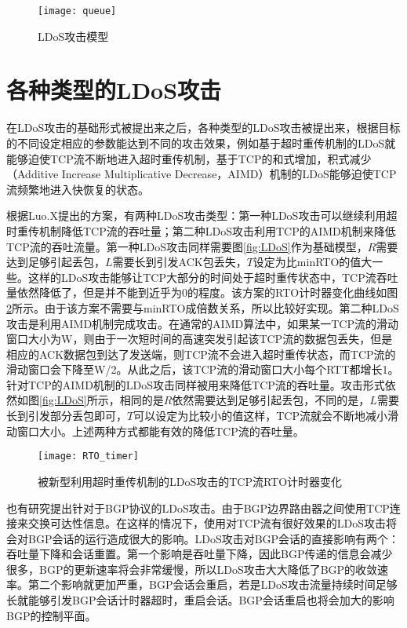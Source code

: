 \begin{figure}
    \centering
    \texttt{[image: queue]}
    \caption{LDoS攻击模型}
    \label{fig:model}
\end{figure}

\section{各种类型的LDoS攻击}
\label{chap3:LDoStypes}
在LDoS攻击的基础形式被提出来之后，各种类型的LDoS攻击被提出来，根据目标的不同设定相应的参数能达到不同的攻击效果，例如基于超时重传机制的LDoS就能够迫使TCP流不断地进入超时重传机制，基于TCP的和式增加，积式减少（Additive Increase Multiplicative Decrease，AIMD）机制的LDoS能够迫使TCP流频繁地进入快恢复的状态。

根据Luo.X\cite{Luo2005OnAN}提出的方案，有两种LDoS攻击类型：第一种LDoS攻击可以继续利用超时重传机制降低TCP流的吞吐量；第二种LDoS攻击利用TCP的AIMD机制来降低TCP流的吞吐流量。第一种LDoS攻击同样需要图\ref{fig:LDoS}作为基础模型，$R$需要达到足够引起丢包，$L$需要长到引发ACK包丢失，$T$设定为比minRTO的值大一些。这样的LDoS攻击能够让TCP大部分的时间处于超时重传状态中，TCP流吞吐量依然降低了，但是并不能到近乎为0的程度。该方案的RTO计时器变化曲线如图\ref{fig:rto-timer-1}所示。由于该方案不需要与minRTO成倍数关系，所以比较好实现。第二种LDoS攻击是利用AIMD机制完成攻击。在通常的AIMD算法中，如果某一TCP流的滑动窗口大小为W，则由于一次短时间的高速突发引起该TCP流的数据包丢失，但是相应的ACK数据包到达了发送端，则TCP流不会进入超时重传状态，而TCP流的滑动窗口会下降至W/2。从此之后，该TCP流的滑动窗口大小每个RTT都增长1。针对TCP的AIMD机制的LDoS攻击同样被用来降低TCP流的吞吐量。攻击形式依然如图\ref{fig:LDoS}所示，相同的是$R$依然需要达到足够引起丢包，不同的是，$L$需要长到引发部分丢包即可，$T$可以设定为比较小的值这样，TCP流就会不断地减小滑动窗口大小。上述两种方式都能有效的降低TCP流的吞吐量。

\begin{figure}
    \centering
    \texttt{[image: RTO\_timer]}
    \caption{被新型利用超时重传机制的LDoS攻击的TCP流RTO计时器变化}
    \label{fig:rto-timer-1}
\end{figure}

也有研究\cite{b2}提出针对于BGP协议的LDoS攻击。由于BGP边界路由器之间使用TCP连接来交换可达性信息。在这样的情况下，使用对TCP流有很好效果的LDoS攻击将会对BGP会话的运行造成很大的影响。LDoS攻击对BGP会话的直接影响有两个：吞吐量下降和会话重置。第一个影响是吞吐量下降，因此BGP传递的信息会减少很多，BGP的更新速率将会非常缓慢，所以LDoS攻击大大降低了BGP的收敛速率。第二个影响就更加严重，BGP会话会重启，若是LDoS攻击流量持续时间足够长就能够引发BGP会话计时器超时，重启会话。BGP会话重启也将会加大的影响BGP的控制平面。

